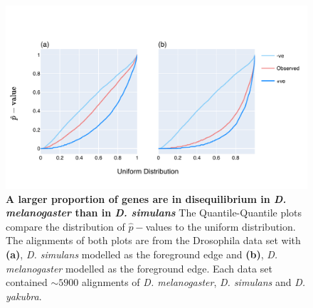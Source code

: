 \begin{figure}[htbp]
\centering
\includegraphics[width=	\textwidth]{figures/plots/drosophila/LRT-QQ.pdf}
\caption[A larger proportion of genes are in disequilibrium in \textit{D. melanogaster} than in \textit{D. simulans}]{\textbf{A larger proportion of genes are in disequilibrium in \textit{D. melanogaster} than in \textit{D. simulans}} The Quantile-Quantile plots compare the distribution of $\hat p-$values to the uniform distribution. The alignments of both plots are from the Drosophila data set with \textbf{(a)}, \textit{D. simulans} modelled as the foreground edge and \textbf{(b)}, \textit{D. melanogaster} modelled as the foreground edge. Each data set contained $\sim 5900$ alignments of \textit{D. melanogaster}, \textit{D. simulans} and \textit{D. yakubra}. }
\label{fig:drosophila_lrt_qq}
\end{figure}
